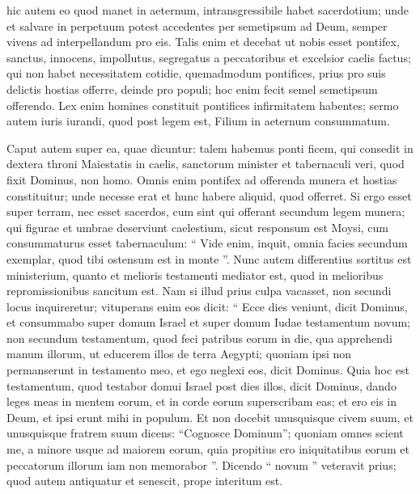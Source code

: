 \begin{biblechapter}
\begin{biblechapter}
\begin{biblechapter}
\begin{biblechapter}
\begin{biblechapter}
\begin{biblechapter}
\begin{biblechapter}
\verse hic autem eo quod manet in aeternum, intransgressibile habet sacerdotium; 
\verse unde et salvare in perpetuum potest accedentes per semetipsum ad Deum, semper vivens ad interpellandum pro eis.
 \verse Talis enim et decebat ut nobis esset pontifex, sanctus, innocens, impollutus, segregatus a peccatoribus et excelsior caelis factus; 
\verse qui non habet necessitatem cotidie, quemadmodum pontifices, prius pro suis delictis hostias offerre, deinde pro populi; hoc enim fecit semel semetipsum offerendo. 
\verse Lex enim homines constituit pontifices infirmitatem habentes; sermo autem iuris iurandi, quod post legem est, Filium in aeternum consummatum.
 
\begin{biblechapter}
\verse Caput autem super ea, quae dicuntur: talem habemus ponti ficem, qui consedit in dextera throni Maiestatis in caelis, 
\verse sanctorum minister et tabernaculi veri, quod fixit Dominus, non homo.
 \verse Omnis enim pontifex ad offerenda munera et hostias constituitur; unde necesse erat et hunc habere aliquid, quod offerret. 
\verse Si ergo esset super terram, nec esset sacerdos, cum sint qui offerant secundum legem munera; 
\verse qui figurae et umbrae deserviunt caelestium, sicut responsum est Moysi, cum consummaturus esset tabernaculum: “ Vide enim, inquit, omnia facies secundum exemplar, quod tibi ostensum est in monte ”. 
\verse Nunc autem differentius sortitus est ministerium, quanto et melioris testamenti mediator est, quod in melioribus repromissionibus sancitum est. 
\verse Nam si illud prius culpa vacasset, non secundi locus inquireretur; 
\verse vituperans enim eos dicit: “ Ecce dies veniunt, dicit Dominus, et consummabo super domum Israel et super domum Iudae testamentum novum; 
\verse non secundum testamentum, quod feci patribus eorum in die, qua apprehendi manum illorum, ut educerem illos de terra Aegypti; quoniam ipsi non permanserunt in testamento meo, et ego neglexi eos, dicit Dominus. 
\verse Quia hoc est testamentum, quod testabor domui Israel post dies illos, dicit Dominus, dando leges meas in mentem eorum, et in corde eorum superscribam eas; et ero eis in Deum, et ipsi erunt mihi in populum. 
\verse Et non docebit unusquisque civem suum, et unusquisque fratrem suum dicens: “Cognosce Dominum”; quoniam omnes scient me, a minore usque ad maiorem eorum, 
\verse quia propitius ero iniquitatibus eorum et peccatorum illorum iam non memorabor ”.
 \verse Dicendo “ novum ” veteravit prius; quod autem antiquatur et senescit, prope interitum est.
 

\end{biblechapter}
\end{biblechapter}
\end{biblechapter}
\end{biblechapter}
\end{biblechapter}
\end{biblechapter}
\end{biblechapter}
\end{biblechapter}
